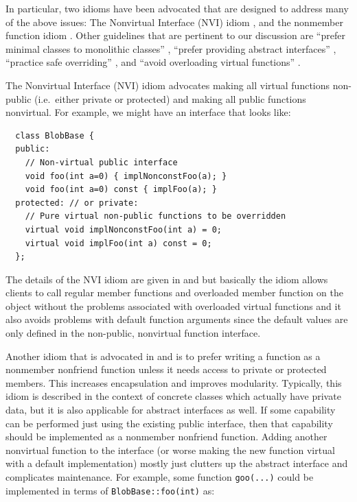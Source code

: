 \documentclass[pdf,ps2pdf,11pt]{SANDreport}
\begin{document}
\begin{itemize}
\end{itemize}

In particular, two idioms have been advocated that are designed to address many
of the above issues: The Nonvirtual Interface (NVI) idiom {}\cite[Item
39]{C++CodingStandards05}, and the nonmember function idiom {}\cite[Item
44]{C++CodingStandards05}.  Other guidelines that are pertinent to our
discussion are ``prefer minimal classes to monolithic classes'' {}\cite[Item
33]{C++CodingStandards05}, ``prefer providing abstract interfaces''
{}\cite[Item 36]{C++CodingStandards05}, ``practice safe overriding''
{}\cite[Item 38]{C++CodingStandards05} {}\cite[Gotcha 74]{C++Gotchas03}, and
``avoid overloading virtual functions'' {}\cite[Gotcha 73]{C++Gotchas03}.

The Nonvirtual Interface (NVI) idiom {}\cite[Item 35]{EffectiveC++3rd}
advocates making all virtual functions non-public (i.e.\ either private or
protected) and making all public functions nonvirtual.  For example, we might
have an interface that looks like:

{\small\begin{verbatim}
  class BlobBase {
  public:
    // Non-virtual public interface
    void foo(int a=0) { implNonconstFoo(a); }
    void foo(int a=0) const { implFoo(a); }
  protected: // or private:
    // Pure virtual non-public functions to be overridden
    virtual void implNonconstFoo(int a) = 0;
    virtual void implFoo(int a) const = 0;
  };
\end{verbatim}}

The details of the NVI idiom are given in {}\cite[Item
39]{C++CodingStandards05} and {}\cite[Item 35]{EffectiveC++3rd} but basically
the idiom allows clients to call regular member functions and overloaded
member function on the object without the problems associated with overloaded
virtual functions and it also avoids problems with default function arguments
since the default values are only defined in the non-public, nonvirtual
function interface.

Another idiom that is advocated in {}\cite[Item 44]{C++CodingStandards05} and
{}\cite[Item 23]{EffectiveC++3rd} is to prefer writing a function as a
nonmember nonfriend function unless it needs access to private or protected
members.  This increases encapsulation and improves modularity.  Typically,
this idiom is described in the context of concrete classes which actually have
private data, but it is also applicable for abstract interfaces as well.  If
some capability can be performed just using the existing public interface,
then that capability should be implemented as a nonmember nonfriend function.
Adding another nonvirtual function to the interface (or worse making the new
function virtual with a default implementation) mostly just clutters up the
abstract interface and complicates maintenance.  For example, some function
{}\texttt{goo(...)} could be implemented in terms of
{}\texttt{BlobBase\-::foo(int)} as:
\end{document}

